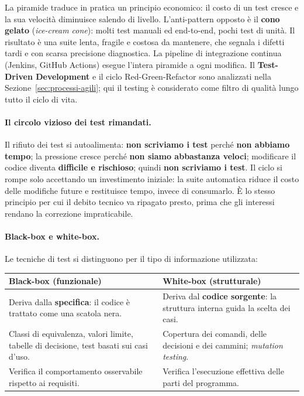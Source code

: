 \documentclass[12pt]{extarticle}
\begin{document}
\noindent La piramide traduce in pratica un principio economico: il costo di un test cresce e la sua velocità diminuisce salendo di livello. L'anti-pattern opposto è il \textbf{cono gelato} (\textit{ice-cream cone}): molti test manuali ed end-to-end, pochi test di unità. Il risultato è una suite lenta, fragile e costosa da mantenere, che segnala i difetti tardi e con scarsa precisione diagnostica. La pipeline di integrazione continua (Jenkins, GitHub Actions) esegue l'intera piramide a ogni modifica. Il \textbf{Test-Driven Development} e il ciclo Red-Green-Refactor sono analizzati nella Sezione~\ref{sec:processi-agili}; qui il testing è considerato come filtro di qualità lungo tutto il ciclo di vita.

\paragraph{Il circolo vizioso dei test rimandati.}
Il rifiuto dei test si autoalimenta: \textbf{non scriviamo i test} perché \textbf{non abbiamo tempo}; la pressione cresce perché \textbf{non siamo abbastanza veloci}; modificare il codice diventa \textbf{difficile e rischioso}; quindi \textbf{non scriviamo i test}. Il ciclo si rompe solo accettando un investimento iniziale: la suite automatica riduce il costo delle modifiche future e restituisce tempo, invece di consumarlo. È lo stesso principio per cui il debito tecnico va ripagato presto, prima che gli interessi rendano la correzione impraticabile.

\paragraph{Black-box e white-box.}
Le tecniche di test si distinguono per il tipo di informazione utilizzata:

\begin{center}
\small
\begin{tabular}{p{7.2cm}p{7.2cm}}
    \toprule
    \textbf{Black-box (funzionale)} & \textbf{White-box (strutturale)} \\
    \midrule
    Deriva dalla \textbf{specifica}: il codice è trattato come una scatola nera. & Deriva dal \textbf{codice sorgente}: la struttura interna guida la scelta dei casi. \\
    \addlinespace
    Classi di equivalenza, valori limite, tabelle di decisione, test basati sui casi d'uso. & Copertura dei comandi, delle decisioni e dei cammini; \textit{mutation testing}. \\
    \addlinespace
    Verifica il comportamento osservabile rispetto ai requisiti. & Verifica l'esecuzione effettiva delle parti del programma. \\
    \bottomrule
\end{tabular}
\end{center}
\end{document}
